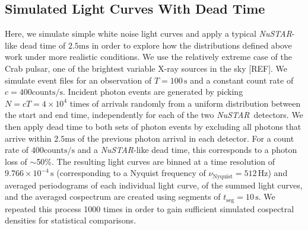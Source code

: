 \documentclass[12pt]{emulateapj}
\newcommand{\project}[1]{\textsl{#1}}
\newcommand{\nustar}{\project{NuSTAR}\xspace}
\begin{document}
\subsection{Simulated Light Curves With Dead Time}

\begin{bf}
Here, we simulate simple white noise light curves and apply a typical \nustar-like dead time of $2.5\mathrm{ms}$ in order to explore how the distributions defined above work under more realistic conditions. We use the relatively extreme case of the Crab pulsar, one of the brightest variable X-ray sources in the sky [REF]. We simulate event files for an observation of $T = 100\,\mathrm{s}$ and a constant count rate of $c = 400 \mathrm{counts}/\mathrm{s}$. Incident photon events are generated by picking $N=cT = 4 \times 10^{4}$ times of arrivals randomly from a uniform distribution between the start and end time, independently for each of the two \nustar\ detectors. We then apply dead time to both sets of photon events by excluding all photons that arrive within $2.5\mathrm{ms}$ of the previous photon arrival in each detector. For a count rate of $400\mathrm{counts}/\mathrm{s}$ and a \nustar-like dead time, this corresponds to a photon loss of $\sim$50\%. The resulting light curves are binned at a time resolution of $9.766 \times 10^{-4}\,\mathrm{s}$ (corresponding to a Nyquist frequency of $\nu_{\mathrm{Nyquist}} = 512 \,\mathrm{Hz}$) and averaged periodograms of each individual light curve, of the summed light curves, and the averaged cospectrum are created using segments of $t_\mathrm{seg} = 10\,\mathrm{s}$. We repeated this process 1000 times in order to gain sufficient simulated cospectral densities for statistical comparisons.


\end{bf}
\end{document}
